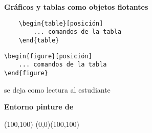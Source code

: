 \documentclass[12pt]{book}
\numberwithin{equation}{section}
\theoremstyle{plain}  %
\begin{document}
%    		
%    		
%    		
%    		
     
 \noindent\textbf{Gráficos y tablas como objetos flotantes}   
 
 
     \begin{verbatim}
	\begin{table}[posición]
		... comandos de la tabla
	\end{table}
\end{verbatim}     
 \begin{verbatim}
\begin{figure}[posición]
	... comandos de la tabla
\end{figure}
\end{verbatim}



 se deja como lectura al estudiante
 
%     
   
 \noindent\textbf{Entorno pinture de \LaTeXe}

  \begin{center}
  	\setlength{\unitlength}{1mm}
  	\begin{picture}(100,100)
    \graphpaper(0,0)(100,100)
  	\end{picture}
  \end{center}
\end{document}
